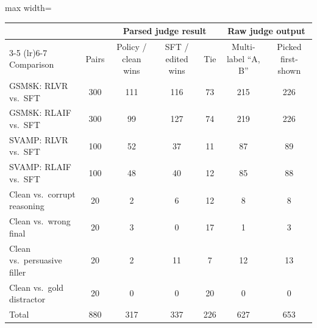 \begin{adjustbox}{max width=\linewidth}
\begin{tabular}{lcccccc}
\toprule
 & & \multicolumn{3}{c}{Parsed judge result} & \multicolumn{2}{c}{Raw judge output} \\
\cmidrule(lr){3-5} \cmidrule(lr){6-7}
Comparison & Pairs & Policy / clean wins & SFT / edited wins & Tie & Multi-label ``A, B'' & Picked first-shown \\
\midrule
GSM8K: RLVR vs.\ SFT & 300 & 111 & 116 & 73 & 215 & 226 \\
GSM8K: RLAIF vs.\ SFT & 300 & 99 & 127 & 74 & 219 & 226 \\
SVAMP: RLVR vs.\ SFT & 100 & 52 & 37 & 11 & 87 & 89 \\
SVAMP: RLAIF vs.\ SFT & 100 & 48 & 40 & 12 & 85 & 88 \\
\midrule
Clean vs.\ corrupt reasoning & 20 & 2 & 6 & 12 & 8 & 8 \\
Clean vs.\ wrong final & 20 & 3 & 0 & 17 & 1 & 3 \\
Clean vs.\ persuasive filler & 20 & 2 & 11 & 7 & 12 & 13 \\
Clean vs.\ gold distractor & 20 & 0 & 0 & 20 & 0 & 0 \\
\midrule
Total & 880 & 317 & 337 & 226 & 627 & 653 \\
\bottomrule
\end{tabular}
\end{adjustbox}
